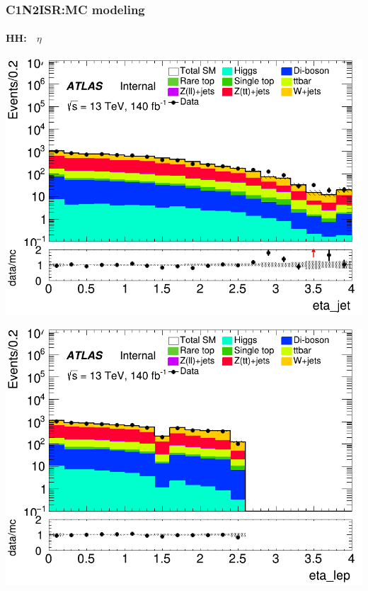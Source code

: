 \documentclass[usenames,dvipsnames]{beamer}
\begin{document}
\begin{frame}
\begin{minipage}{0.32\textwidth}
    \end{minipage}
\end{frame}

\begin{frame}
\frametitle{C1N2ISR:MC modeling}
\framesubtitle{HH:$\quad\eta$}
    \begin{minipage}{0.32\textwidth}
        \centering
        \includegraphics[width=\textwidth]{graphics/HH_met/HH_met_eta_jet.png}
    \end{minipage}
    \hfill
    \begin{minipage}{0.32\textwidth}
        \centering
        \includegraphics[width=\textwidth]{graphics/HH_met/HH_met_eta_lep.png}
    \end{minipage}
    \hfill
    \begin{minipage}{0.32\textwidth}

\end{minipage}
\end{frame}
\end{document}
